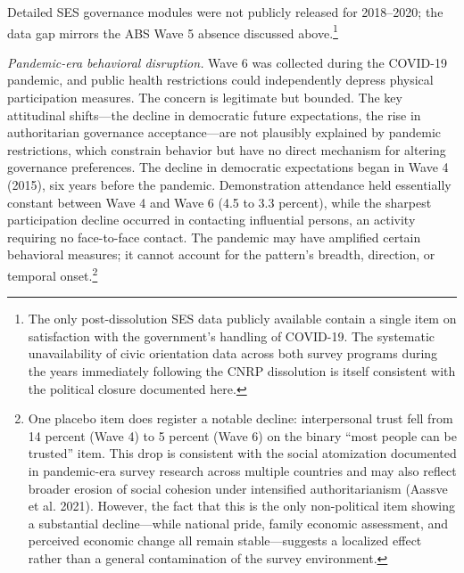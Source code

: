 \documentclass[Review,times,sageh,doublespace]{sagej}
\begin{document}
Detailed SES governance modules were not publicly released for
2018--2020; the data gap mirrors the ABS Wave 5 absence discussed
above.\footnote{The only post-dissolution SES data publicly available
  contain a single item on satisfaction with the government's handling
  of COVID-19. The systematic unavailability of civic orientation data
  across both survey programs during the years immediately following the
  CNRP dissolution is itself consistent with the political closure
  documented here.}

\emph{Pandemic-era behavioral disruption.} Wave 6 was collected during
the COVID-19 pandemic, and public health restrictions could
independently depress physical participation measures. The concern is
legitimate but bounded. The key attitudinal shifts---the decline in
democratic future expectations, the rise in authoritarian governance
acceptance---are not plausibly explained by pandemic restrictions, which
constrain behavior but have no direct mechanism for altering governance
preferences. The decline in democratic expectations began in Wave 4
(2015), six years before the pandemic. Demonstration attendance held
essentially constant between Wave 4 and Wave 6 (4.5 to 3.3 percent),
while the sharpest participation decline occurred in contacting
influential persons, an activity requiring no face-to-face contact. The
pandemic may have amplified certain behavioral measures; it cannot
account for the pattern's breadth, direction, or temporal
onset.\footnote{One placebo item does register a notable decline:
  interpersonal trust fell from 14 percent (Wave 4) to 5 percent (Wave
  6) on the binary ``most people can be trusted'' item. This drop is
  consistent with the social atomization documented in pandemic-era
  survey research across multiple countries and may also reflect broader
  erosion of social cohesion under intensified authoritarianism (Aassve
  et al. 2021). However, the fact that this is the only non-political
  item showing a substantial decline---while national pride, family
  economic assessment, and perceived economic change all remain
  stable---suggests a localized effect rather than a general
  contamination of the survey environment.}
\end{document}
